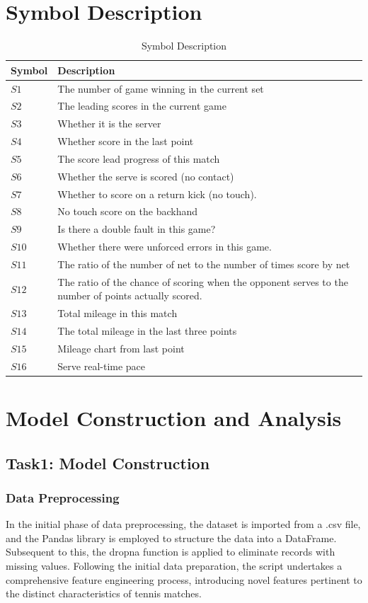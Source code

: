 \documentclass[12pt]{article}
\begin{document}
\section{Symbol Description}
\begin{table}[H]
\centering
\begin{tabular}{|>{\centering\arraybackslash}m{2.5cm}|p{}|}
\hline
\textbf{Symbol} & \textbf{Description} \\ \hline
$S1$ & The number of game winning in the current set \\ \hline
$S2$ & The leading scores in the current game \\ \hline
$S3$ & Whether it is the server \\ \hline
$S4$ & Whether score in the last point \\ \hline
$S5$ & The score lead progress of this match\\ \hline
$S6$ & Whether the serve is scored (no contact) \\ \hline
$S7$ & Whether to score on a return kick (no touch). \\ \hline
$S8$ & No touch score on the backhand \\ \hline
$S9$ & Is there a double fault in this game? \\ \hline
$S10$ & Whether there were unforced errors in this game. \\ \hline
$S11$ & The ratio of the number of net to the number of times score by net \\ \hline
$S12$ & The ratio of the chance of scoring when the opponent serves to the number of points actually scored. \\ \hline
$S13$ & Total mileage in this match \\ \hline
$S14$ & The total mileage in the last three points \\ \hline
$S15$ & Mileage chart from last point \\ \hline
$S16$ & Serve real-time pace \\ \hline
\end{tabular}
\caption{Symbol Description}
\end{table}
\section{Model Construction and Analysis}
\subsection{Task1: Model Construction}
\subsubsection{Data Preprocessing}
In the initial phase of data preprocessing, the dataset is imported from a .csv file, and the Pandas library is employed to structure the data into a DataFrame. Subsequent to this, the dropna function is applied to eliminate records with missing values. Following the initial data preparation, the script undertakes a comprehensive feature engineering process, introducing novel features pertinent to the distinct characteristics of tennis matches.
\end{document}
